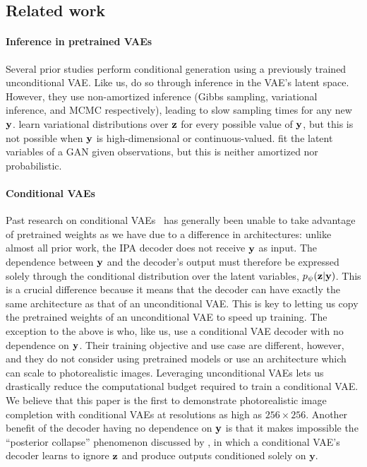 \subsection{Related work}
\paragraph{Inference in pretrained VAEs}
Several prior studies perform conditional generation using a previously trained
unconditional VAE.
%
Like us, \citet{rezende2014stochastic,nguyen2016plug,wu2018conditional} do so
through inference in the VAE's latent space. However, they use non-amortized
inference (Gibbs sampling, variational inference, and MCMC respectively),
leading to slow sampling times for any new ${\mathbf{y}}$.
%
\citet{duan2019pre} learn variational distributions over ${\mathbf{z}}$ for every possible
value of ${\mathbf{y}}$, but this is not possible when ${\mathbf{y}}$ is
high-dimensional or continuous-valued.
%
\citet{yeh2017semantic} fit the latent variables of a GAN given observations,
but this is neither amortized nor probabilistic.
%

\paragraph{Conditional VAEs}
Past research on conditional
VAEs~\citep{sohn2015learning,zheng2019pluralistic,ivanov2018variational,wan2021high}
has generally been unable to take advantage of pretrained weights as we have due
to a difference in architectures: unlike almost all prior work, the IPA decoder
does not receive ${\mathbf{y}}$ as input. The dependence between ${\mathbf{y}}$ and the
decoder's output must therefore be expressed solely through the conditional
distribution over the latent variables, $p_\psi({\mathbf{z}}|{\mathbf{y}})$. This is a crucial
difference because it means that the decoder can have exactly the same
architecture as that of an unconditional VAE. This is key to letting us copy the
pretrained weights of an unconditional VAE to speed up training. The exception
to the above is \citet{ma2018eddi} who, like us, use a conditional VAE decoder
with no dependence on ${\mathbf{y}}$. Their training objective and use case are
different, however, and they do not consider using pretrained models or use an
architecture which can scale to photorealistic images. Leveraging unconditional
VAEs lets us drastically reduce the computational budget required to train a
conditional VAE. We believe that this paper is the first to demonstrate
photorealistic image completion with conditional VAEs at resolutions as high as
$256\times256$.
% 
Another benefit of the decoder having no dependence on ${\mathbf{y}}$ is that it
makes impossible the ``posterior collapse'' phenomenon discussed by
\citet{zheng2019pluralistic}, in which a conditional VAE's decoder learns to
ignore ${\mathbf{z}}$ and produce outputs conditioned solely on $\mathbf{y}$.


